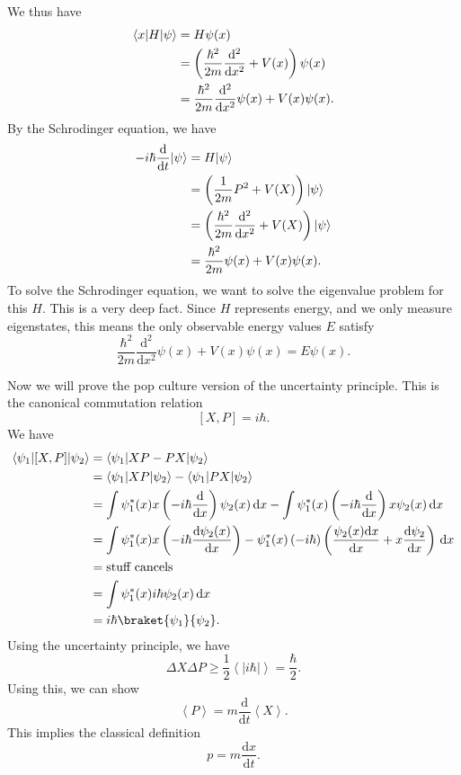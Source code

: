 We thus have
\begin{align*}
	\langle x\rvert H \lvert\psi \rangle &=H \psi (x)\\
			      &=\left( \frac{\hbar ^2}{2m} \frac{\mathrm{d}^2}{\mathrm{d}x^2} +V(x) \right) \psi (x)\\
			      &=\frac{\hbar ^2}{2m} \frac{\mathrm{d}^2}{\mathrm{d}x^2} \psi (x)+V(x)\psi (x)
.\end{align*}
By the Schrodinger equation, we have
\begin{align*}
	-i\hbar \frac{\mathrm{d}}{\mathrm{d}t} \lvert\psi \rangle &=H \lvert\psi \rangle \\
							   &=\left( \frac{1}{2m} P^2+V(X) \right) \lvert\psi \rangle \\
							   &=\left( \frac{\hbar ^2}{2m} \frac{\mathrm{d}^2}{\mathrm{d}x^2} +V(X) \right) \lvert\psi \rangle \\
							   &=\frac{\hbar ^2}{2m} \psi (x)+V(x)\psi (x)
.\end{align*}
To solve the Schrodinger equation, we want to solve the eigenvalue problem for this $H$. This is a very deep fact. Since $H$ represents energy, and we only measure eigenstates, this means the only observable energy values $E$ satisfy
\[
	\frac{\hbar ^2}{2m}\frac{\mathrm{d}^2}{\mathrm{d}x^2} \psi (x)+V(x)\psi (x)=E \psi (x)
.\]

Now we will prove the pop culture version of the uncertainty principle. This is the canonical commutation relation
\[
	[X,P]=i \hbar 
.\]
We have
\begin{align*}
	\bra{\psi _1} [X,P]\ket{\psi _2} &=\bra{\psi _1} XP-PX\ket{\psi _2} \\
					 &=\bra{\psi _1} XP \ket{\psi _2} -\bra{\psi _1} PX\ket{\psi _2} \\
					 &=\int \psi_1^*(x) x\left( -i \hbar \frac{\mathrm{d}}{\mathrm{d}x}  \right) \psi_2(x) \,\mathrm{d} x-\int \psi_1^*(x)\left( -i \hbar \frac{\mathrm{d}}{\mathrm{d}x}  \right) x \psi _2(x) \,\mathrm{d} x\\
					 &=\int \psi_1^*(x)x\left( -i \hbar \frac{\mathrm{d}\psi _2(x)}{\mathrm{d}x}  \right) -\psi_1^*(x)\left( -i \hbar  \right) \left( \frac{\psi _2(x)\mathrm{d}x}{\mathrm{d}x} +x \frac{\mathrm{d}\psi _2}{\mathrm{d}x}  \right)  \,\mathrm{d} x\\
					 &=\text{stuff cancels} \\
					 &=\int \psi _1^*(x)i\hbar \psi_2(x) \,\mathrm{d} x\\
					 &=i\hbar \braket{\psi _1}{\psi _2} 
.\end{align*}
Using the uncertainty principle, we have
\[
	\Delta X\Delta P\geq \frac{1}{2} \left\langle \left| i \hbar  \right|  \right\rangle =\frac{\hbar }{2} 
.\]
Using this, we can show
\[
	\left\langle P \right\rangle =m \frac{\mathrm{d}}{\mathrm{d}t} \left\langle X \right\rangle 
.\]
This implies the classical definition
\[
	p=m \frac{\mathrm{d}x}{\mathrm{d}t} 
.\]

